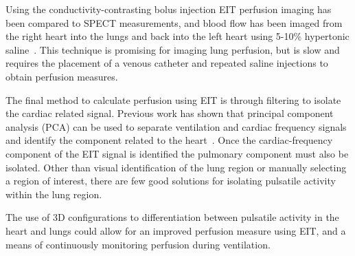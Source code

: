 Using the conductivity-contrasting bolus injection EIT perfusion imaging has been compared to 
SPECT measurements, and blood flow has been imaged from the right heart into the lungs and back into the left heart
using 5-10\% hypertonic saline~\parencite{Frerichs2002,Borges2012}. This technique is promising 
for imaging lung perfusion, but is slow and requires the placement of a venous catheter 
and repeated saline injections to obtain perfusion measures. 

The final method to calculate perfusion using EIT is through filtering to isolate the 
cardiac related signal. Previous work has shown that principal component analysis (PCA) 
can be used to separate ventilation and cardiac frequency signals and identify the component 
related to the heart~\parencite{Deibele2008}. Once the cardiac-frequency component of the 
EIT signal is identified the pulmonary component must also be isolated. Other than visual 
identification of the lung region or manually selecting a region of interest,
there are few good solutions for isolating pulsatile activity within the lung region.

The use of 3D configurations to differentiation between pulsatile activity 
in the heart and lungs could allow for an improved perfusion measure 
using EIT, and a means of continuously monitoring perfusion during ventilation.

